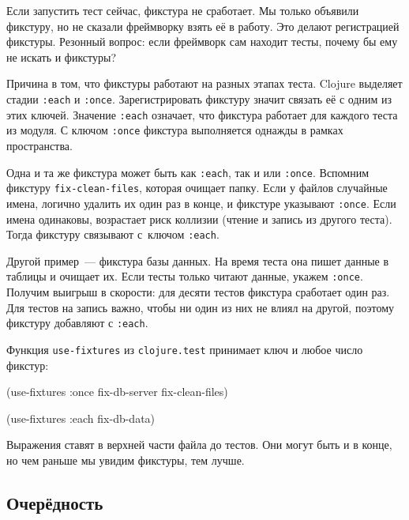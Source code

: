 
Если запустить тест сейчас, фикстура не сработает. Мы только объявили фикстуру,
но не сказали фреймворку взять её в работу. Это делают регистрацией фикстуры.
Резонный вопрос: если фреймворк сам находит тесты, почему бы ему не искать и
фикстуры?

Причина в том, что фикстуры работают на разных этапах теста. Clojure выделяет
стадии \verb|:each| и \verb|:once|. Зарегистрировать фикстуру значит связать
её с одним из этих ключей. Значение \verb|:each| означает, что фикстура
работает для каждого теста из модуля. С ключом \verb|:once| фикстура
выполняется однажды в рамках пространства.


\mnoindent
Одна и та же фикстура может быть как \verb|:each|, так и или
\verb|:once|. Вспомним фикстуру \verb|fix-clean-files|, которая очищает
папку. Если у файлов случайные имена, логично удалить их один раз в конце, и
фикстуре указывают \verb|:once|. Если имена одинаковы, возрастает риск коллизии
(чтение и запись из другого теста). Тогда фикстуру связывают с~ключом
\verb|:each|.

Другой пример~--- фикстура базы данных. На время теста она пишет данные в
таблицы и очищает их. Если тесты только читают данные, укажем
\verb|:once|. Получим выигрыш в скорости: для десяти тестов фикстура сработает
один раз. Для тестов на запись важно, чтобы ни один из них не влиял на другой,
поэтому фикстуру добавляют с \verb|:each|.

Функция \verb|use-fixtures| из \verb|clojure.test| принимает ключ и любое
число фикстур:


\begin{english}
  \begin{clojure}
(use-fixtures :once
  fix-db-server fix-clean-files)

(use-fixtures :each fix-db-data)
  \end{clojure}
\end{english}

Выражения ставят в верхней части файла до тестов. Они могут быть и в конце, но
чем раньше мы увидим фикстуры, тем лучше.

\subsection{Очерёдность}


